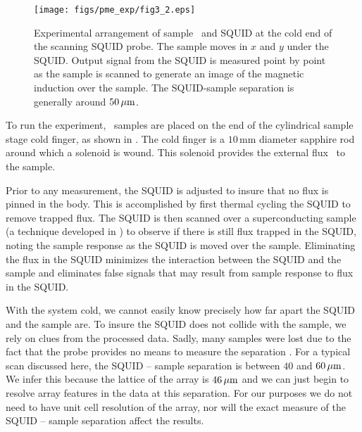 %
%
\begin{figure}[p]
\texttt{[image: figs/pme\_exp/fig3\_2.eps]}
\caption[Experimental arrangement of sample \jja\ and SQUID in the
probe.]{Experimental arrangement of sample \jja\ and SQUID at the cold
end of the scanning SQUID probe. The sample moves in $x$ and $y$
under the SQUID. Output signal from the SQUID is measured point by point
as the sample is scanned to generate an image of the magnetic induction
over the sample. The SQUID-sample separation is generally around 
$50\,\mu\mathrm{m}$. }
\label{fig:pme_experimental_setup}
\end{figure}

To run the experiment, \jja\ samples are placed on the end of the
cylindrical sample
stage cold finger, as shown in . 
The cold finger is a $10\,\mathrm{mm}$ diameter sapphire 
rod around which a solenoid is wound. This solenoid provides the external
flux \Phiext\ to the sample. 

Prior to any measurement, the SQUID is adjusted
to insure that no flux is pinned in the body. This is accomplished by
first
thermal cycling the SQUID to remove trapped flux.  The
SQUID  is then scanned over a superconducting 
sample  (a technique developed in )
to observe if there is still
flux trapped in the SQUID, noting the sample 
response
as 
the SQUID is moved over the sample.
Eliminating the flux in the SQUID
minimizes the interaction between the SQUID and the sample and eliminates 
false signals that may result from
sample response to flux in the SQUID.

With the system cold,
we cannot easily know precisely how far apart the SQUID and the sample are.
To insure the SQUID does not collide with the sample, 
we rely on clues from the processed data. 
Sadly, many samples were lost due to the fact that 
the probe
provides no means to measure the separation \insitu. For a typical
scan discussed here, the SQUID -- sample separation is between
$40$ and $60\,\mu\mathrm{m}$. We infer this
because the lattice of the array is $46\,\mu\mathrm{m}$ and 
we can just begin to resolve array 
features in the data at this separation. For our
purposes we do not need to have unit cell resolution of the array,
nor will the exact measure of the SQUID -- sample separation affect the 
results. 

%
%

